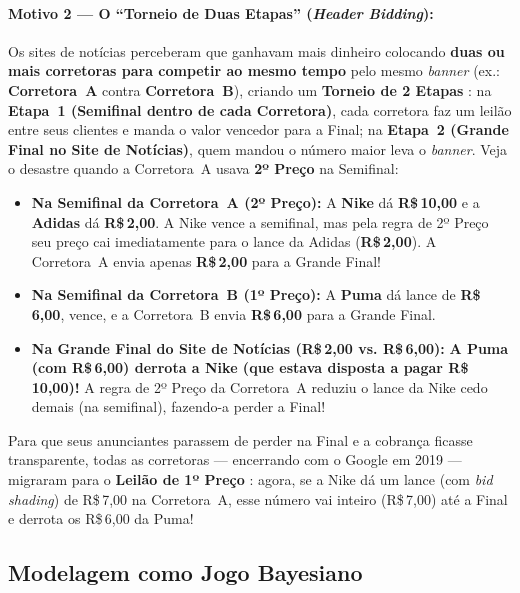 \paragraph{Motivo 2 --- O ``Torneio de Duas Etapas'' (\textit{Header Bidding}):}
Os sites de notícias perceberam que ganhavam mais dinheiro colocando \textbf{duas ou mais corretoras para competir ao mesmo tempo} pelo mesmo \textit{banner} (ex.: \textbf{Corretora~A} contra \textbf{Corretora~B}), criando um \textbf{Torneio de 2 Etapas} \cite[p.~2--4]{despotakis2021}: na \textbf{Etapa~1 (Semifinal dentro de cada Corretora)}, cada corretora faz um leilão entre seus clientes e manda o valor vencedor para a Final; na \textbf{Etapa~2 (Grande Final no Site de Notícias)}, quem mandou o número maior leva o \textit{banner}. Veja o desastre quando a Corretora~A usava \textbf{2º Preço} na Semifinal:
\begin{itemize}
    \item \textbf{Na Semifinal da Corretora~A (2º Preço):} A \textbf{Nike} dá \textbf{R\$\,10,00} e a \textbf{Adidas} dá \textbf{R\$\,2,00}. A Nike vence a semifinal, mas pela regra de 2º Preço seu preço cai imediatamente para o lance da Adidas (\textbf{R\$\,2,00}). A Corretora~A envia apenas \textbf{R\$\,2,00} para a Grande Final!
    \item \textbf{Na Semifinal da Corretora~B (1º Preço):} A \textbf{Puma} dá lance de \textbf{R\$\,6,00}, vence, e a Corretora~B envia \textbf{R\$\,6,00} para a Grande Final.
    \item \textbf{Na Grande Final do Site de Notícias (R\$\,2,00 vs. R\$\,6,00):} \textbf{A Puma (com R\$\,6,00) derrota a Nike (que estava disposta a pagar R\$\,10,00)!} A regra de 2º Preço da Corretora~A reduziu o lance da Nike cedo demais (na semifinal), fazendo-a perder a Final!
\end{itemize}
Para que seus anunciantes parassem de perder na Final e a cobrança ficasse transparente, todas as corretoras --- encerrando com o Google em 2019 --- migraram para o \textbf{Leilão de 1º Preço} \cite[Proposição~4, p.~22]{despotakis2021}: agora, se a Nike dá um lance (com \textit{bid shading}) de R\$\,7,00 na Corretora~A, esse número vai inteiro (R\$\,7,00) até a Final e derrota os R\$\,6,00 da Puma!

\subsection{Modelagem como Jogo Bayesiano}
\label{subsec:modelagem_caso}

